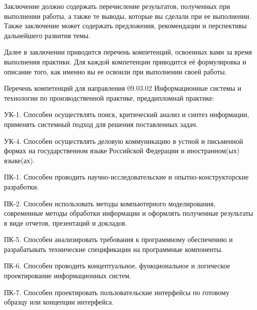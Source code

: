 \conclusion
Заключение должно содержать перечисление результатов, полученных при
выполнении работы, а также те выводы, которые вы сделали при ее
выполнении. Также заключение может содержать предложения,
рекомендации и перспективы дальнейшего развития темы. 

Далее в заключении приводится перечень компетенций, освоенных вами
за время выполнения практики. Для каждой компетенции приводится её
формулировка и описание того, как именно вы ее освоили при
выполнении своей работы.

Перечень компетенций для направления 09.03.02 Информационные системы
и технологии по производственной практике, преддипломнай практике:

УК-1. Способен осуществлять поиск, критический анализ и синтез информации, применять системный подход для решения поставленных задач.

УК-4. Способен осуществлять деловую коммуникацию в устной и письменной формах на государственном языке Российской Федерации и иностранном(ых) языке(ах).

ПК-1. Способен проводить научно-исследовательские и опытно-конструкторские разработки.

ПК-2. Способен использовать методы компьютерного моделирования, современные методы обработки информации и оформлять полученные результаты в виде отчетов, презентаций и докладов.

ПК-5. Способен анализировать требования к программному обеспечению и разрабатывать технические спецификации на программные компоненты.

ПК-6. Способен проводить концептуальное, функциональное и логическое проектирование информационных систем.

ПК-7. Способен проектировать пользовательские интерфейсы по готовому образцу или концепции интерфейса.

